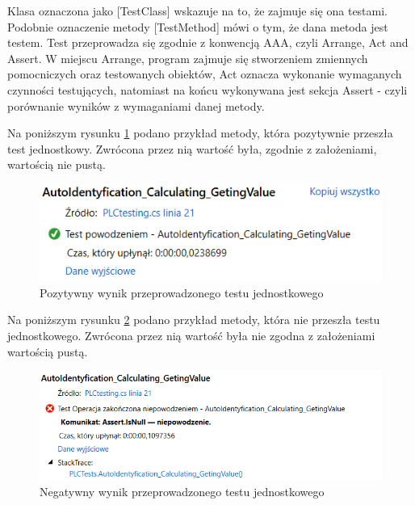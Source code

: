 Klasa oznaczona jako [TestClass] wskazuje na to, że zajmuje się ona testami. Podobnie oznaczenie metody [TestMethod] mówi o tym, że dana metoda jest testem. Test przeprowadza się zgodnie z konwencją AAA, czyli Arrange, Act and Assert. W miejscu Arrange, program zajmuje się stworzeniem zmiennych pomocniczych oraz testowanych obiektów, Act oznacza wykonanie wymaganych czynności testujących, natomiast na końcu wykonywana jest sekcja Assert - czyli porównanie wyników z wymaganiami danej metody. \newline

Na poniższym rysunku \ref{pozytyw} podano przykład metody, która pozytywnie przeszła test jednostkowy. Zwrócona przez nią wartość była, zgodnie z założeniami, wartością nie pustą.

\begin{figure}[ht!]
\centering
\includegraphics[scale=0.7]{testpozytyw}
\caption{Pozytywny wynik przeprowadzonego testu jednostkowego}
\label{pozytyw}
\end{figure} 

Na poniższym rysunku \ref{negatyw} podano przykład metody, która nie przeszła testu jednostkowego. Zwrócona przez nią wartość była nie zgodna z założeniami wartością pustą.


\begin{figure}[ht!]
\centering
\includegraphics[scale=0.69]{testnegatyw}
\caption{Negatywny wynik przeprowadzonego testu jednostkowego}
\label{negatyw}
\end{figure} 